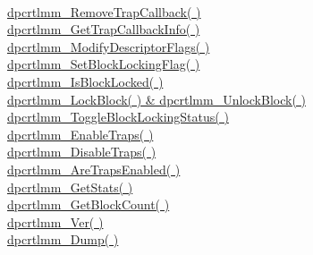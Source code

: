 \documentclass{article}
\begin{document}
\\
\href{#RemoveTrapCallback}{dpcrtlmm\_RemoveTrapCallback( )}
\\
\href{#GetTrapCallbackInfo}{dpcrtlmm\_GetTrapCallbackInfo( )}
\\
\href{#ModifyDescriptorFlags}{dpcrtlmm\_ModifyDescriptorFlags( )}
\\
\href{#SetBlockLockingFlag}{dpcrtlmm\_SetBlockLockingFlag( )}
\\
\href{#IsBlockLocked}{dpcrtlmm\_IsBlockLocked( )}
\\
\href{#LockBlock}{dpcrtlmm\_LockBlock( ) \& dpcrtlmm\_UnlockBlock(
)}
\\
\href{#ToggleBlockLockingStatus}{dpcrtlmm\_ToggleBlockLockingStatus(
)}
\\
\href{#EnableTraps}{dpcrtlmm\_EnableTraps( )}
\\
\href{#DisableTraps}{dpcrtlmm\_DisableTraps( )}
\\
\href{#AreTrapsEnabled}{dpcrtlmm\_AreTrapsEnabled( )}
\\
\href{#GetStats}{dpcrtlmm\_GetStats( )}
\\
\href{#GetBlockCount}{dpcrtlmm\_GetBlockCount( )}
\\
\href{#Ver}{dpcrtlmm\_Ver( )}
\\
\href{#Dump}{dpcrtlmm\_Dump( )}
\end{document}
